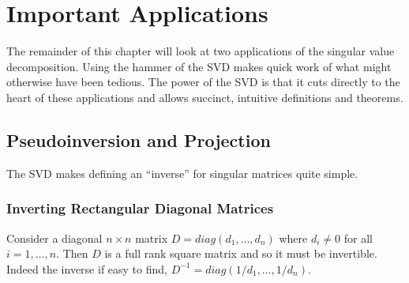 \documentclass{book}
\begin{document}
\section{Important Applications}

The remainder of this chapter will look at two applications of the singular value decomposition. Using the hammer of the SVD makes quick work of what might otherwise have been tedious. The power of the SVD is that it cuts directly to the heart of these applications and allows succinct, intuitive definitions and theorems. 

\subsection{Pseudoinversion and Projection}

The SVD makes defining an ``inverse'' for singular matrices quite simple. 

\subsubsection{Inverting Rectangular Diagonal Matrices}

Consider a diagonal $n \times n$ matrix $D=diag(d_1,\ldots,d_n)$ where $d_i \neq 0$ for all $i=1,\ldots,n$. Then $D$ is a full rank square matrix and so it must be invertible. Indeed the inverse if easy to find, $D^{-1}=diag(1/d_1,\ldots,1/d_n)$.
\end{document}
